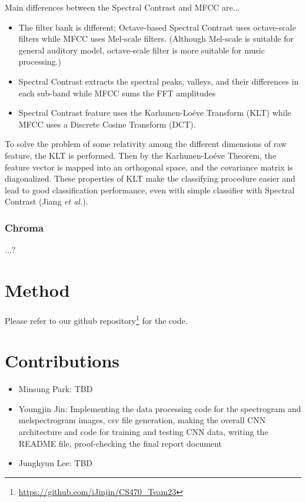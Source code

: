 \documentclass{article}
\theoremstyle{plain}
\theoremstyle{definition}
\theoremstyle{remark}
\begin{document}
Main differences between the Spectral Contrast and MFCC are...

\begin{itemize}
	\item The filter bank is different; Octave-based Spectral Contrast uses octave-scale filters while MFCC uses Mel-scale filters.
	(Although Mel-scale is suitable for general auditory model, octave-scale filter is more suitable for music processing.)
	
	\item Spectral Contrast extracts the spectral peaks, valleys, and their differences in each sub-band while MFCC sums the FFT amplitudes
	
	\item Spectral Contrast feature uses the Karhunen-Lo\'eve Transform (KLT) while MFCC uses a Discrete Cosine Transform (DCT).
\end{itemize}

To solve the problem of some relativity among the different dimensions of raw feature, the KLT is performed.
Then by the Karhunen-Lo\'eve Theorem, the feature vector is mapped into an orthogonal space, and the covariance matrix is diagonalized.
These properties of KLT make the classifying procedure easier and lead to good classification performance, even with simple classifier with Spectral Contrast (Jiang {\it et al.}).

\subsubsection{Chroma}
...?


\section{Method}

Please refer to our github repository\footnote{\url{https://github.com/iJinjin/CS470_Team23}} for the code.

\section{Contributions}

\begin{itemize}
\item Minsung Park: TBD

\item Youngjin Jin: Implementing the data processing code for the spectrogram and melspectrogram images, csv file generation, making the overall CNN architecture and code for training and testing CNN data, writing the README file, proof-checking the final report document

\item Junghyun Lee: TBD

\end{itemize}
\end{document}
